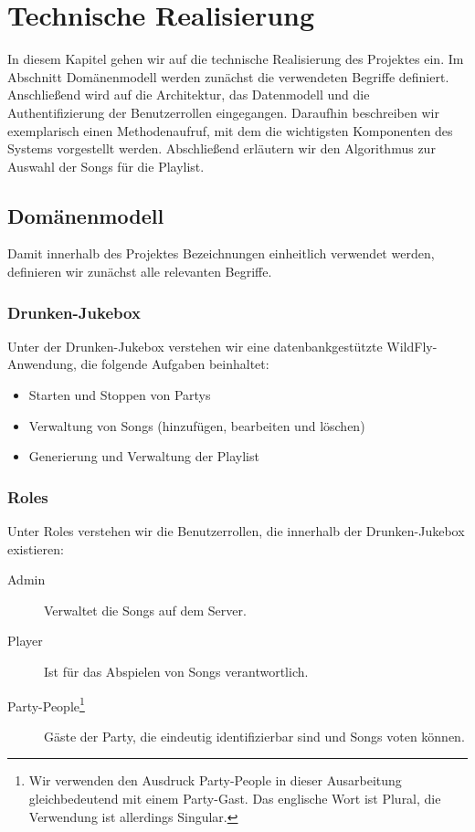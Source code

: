 \section{Technische Realisierung}
In diesem Kapitel gehen wir auf die technische Realisierung des Projektes ein. Im Abschnitt Domänenmodell werden zunächst die verwendeten Begriffe definiert. Anschließend wird auf die Architektur, das Datenmodell und die Authentifizierung der Benutzerrollen eingegangen. Daraufhin beschreiben wir exemplarisch einen Methodenaufruf, mit dem die wichtigsten Komponenten des Systems vorgestellt werden. Abschließend erläutern wir den Algorithmus zur Auswahl der Songs für die Playlist.

\subsection{Domänenmodell}
\label{sec:Domaenenmodell}
Damit innerhalb des Projektes Bezeichnungen einheitlich verwendet werden, definieren wir zunächst alle relevanten Begriffe.

\subsubsection{Drunken-Jukebox}
Unter der Drunken-Jukebox verstehen wir eine datenbankgestützte WildFly-Anwendung, die folgende Aufgaben beinhaltet:

\begin{itemize}
	\item Starten und Stoppen von Partys
	\item Verwaltung von Songs (hinzufügen, bearbeiten und löschen)
	\item Generierung und Verwaltung der Playlist
\end{itemize}

\subsubsection{Roles}
Unter Roles verstehen wir die Benutzerrollen, die innerhalb der Drunken-Jukebox existieren:

\begin{description}
	\item [Admin] Verwaltet die Songs auf dem Server.
	\item [Player] Ist für das Abspielen von Songs verantwortlich.
	\item [Party-People\footnote{Wir verwenden den Ausdruck Party-People in dieser Ausarbeitung gleichbedeutend mit einem Party-Gast. Das englische Wort ist Plural, die Verwendung ist allerdings Singular.}] Gäste der Party, die eindeutig identifizierbar sind und Songs voten können.
\end{description}

